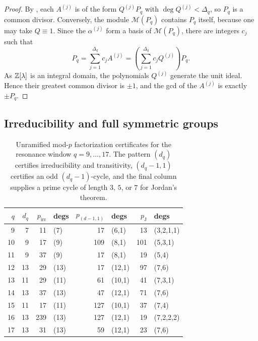 \begin{proof}
By , each \(A^{(j)}\) is of the form
\(Q^{(j)}P_q\) with \(\deg Q^{(j)}<\Delta_q\), so \(P_q\) is a common divisor.
Conversely, the module \(\mathcal M(P_q)\) contains \(P_q\) itself, because one
may take \(Q\equiv 1\).  Since the \(\alpha^{(j)}\) form a basis of
\(\mathcal M(P_q)\), there are integers \(c_j\) such that
\[
  P_q=\sum_{j=1}^{\Delta_q} c_j A^{(j)}
  =\left(\sum_{j=1}^{\Delta_q} c_jQ^{(j)}\right)P_q.
\]
As \(\mathbb{Z}[\lambda]\) is an integral domain, the polynomials \(Q^{(j)}\) generate
the unit ideal.  Hence their greatest common divisor is \(\pm1\), and the gcd of
the \(A^{(j)}\) is exactly \(\pm P_q\).
\end{proof}

\subsection{Irreducibility and full symmetric groups}

\begin{table}[t]
\centering
\scriptsize
\setlength{\tabcolsep}{5pt}
\caption{Unramified mod-\(p\) factorization certificates for the resonance
window \(q=9,\dots,17\).  The pattern \((d_q)\) certifies irreducibility and
transitivity, \((d_q-1,1)\) certifies an odd \((d_q-1)\)-cycle, and the final
column supplies a prime cycle of length \(3\), \(5\), or \(7\) for Jordan's
theorem.}
\label{tab:galois-certificates-q9-17}
\begin{tabular}{r r r l r l r l}
\toprule
\(q\) & \(d_q\) & \(p_{\mathrm{irr}}\) & degs & \(p_{(d-1,1)}\) & degs & \(p_{\mathrm{J}}\) & degs\\
\midrule
9  & 7  & 11  & (7)  & 17  & (6,1)   & 13 & (3,2,1,1) \\
10 & 9  & 17  & (9)  & 109 & (8,1)   & 101 & (5,3,1) \\
11 & 9  & 37  & (9)  & 17  & (8,1)   & 19 & (5,4) \\
12 & 13 & 29  & (13) & 17  & (12,1)  & 97 & (7,6) \\
13 & 11 & 29  & (11) & 61  & (10,1)  & 41 & (7,3,1) \\
14 & 13 & 37  & (13) & 47  & (12,1)  & 71 & (7,6) \\
15 & 11 & 17  & (11) & 127 & (10,1)  & 37 & (7,4) \\
16 & 13 & 239 & (13) & 127 & (12,1)  & 19 & (7,2,2,2) \\
17 & 13 & 31  & (13) & 59  & (12,1)  & 23 & (7,6) \\
\bottomrule
\end{tabular}
\end{table}

